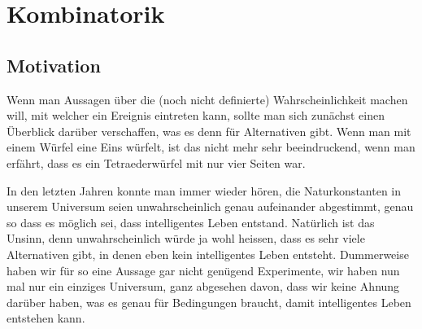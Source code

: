 %
%
%
\chapter{Kombinatorik} \label{chapter:kombinatorik}
\section{Motivation}
Wenn man Aussagen über die (noch nicht definierte) Wahrscheinlichkeit
machen will, mit welcher ein Ereignis eintreten kann, sollte man sich
zunächst einen Überblick darüber verschaffen, was es denn für
Alternativen gibt.
Wenn man mit einem Würfel eine Eins würfelt, ist
das nicht mehr sehr beeindruckend, wenn man erfährt, dass es ein
Tetraederwürfel mit nur vier Seiten war. 

In den letzten Jahren konnte man immer wieder hören, die Naturkonstanten
in unserem Universum seien unwahrscheinlich genau aufeinander abgestimmt,
genau so dass es möglich sei, dass intelligentes Leben entstand.
Natürlich ist das Unsinn, denn unwahrscheinlich würde ja wohl
heissen, dass es sehr viele Alternativen gibt, in denen eben kein
intelligentes Leben entsteht.
Dummerweise haben wir für so eine Aussage
gar nicht genügend Experimente, wir haben nun mal nur ein einziges
Universum, ganz abgesehen davon, dass wir keine Ahnung darüber haben,
was es genau für Bedingungen braucht, damit intelligentes Leben
entstehen kann.










